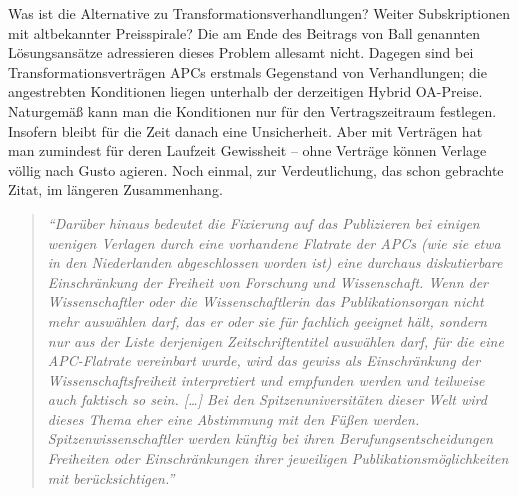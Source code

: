 \documentclass[a4paper,
fontsize=11pt,
oneside,
numbers=noperiodatend,
parskip=half-,
bibliography=totoc,
final
]{scrartcl}
\begin{document}
Was ist die Alternative zu Transformationsverhandlungen? Weiter
Subskriptionen mit altbekannter Preisspirale? Die am Ende des Beitrags
von Ball genannten Lösungsansätze adressieren dieses Problem allesamt
nicht. Dagegen sind bei Transformationsverträgen APCs erstmals
Gegenstand von Verhandlungen; die angestrebten Konditionen liegen
unterhalb der derzeitigen Hybrid OA-Preise. Naturgemäß kann man die
Konditionen nur für den Vertragszeitraum festlegen. Insofern bleibt für
die Zeit danach eine Unsicherheit. Aber mit Verträgen hat man zumindest
für deren Laufzeit Gewissheit -- ohne Verträge können Verlage völlig
nach Gusto agieren. Noch einmal, zur Verdeutlichung, das schon gebrachte
Zitat, im längeren Zusammenhang.

\begin{quote}
\emph{\enquote{Darüber hinaus bedeutet die Fixierung auf das Publizieren
bei einigen wenigen Verlagen durch eine vorhandene Flatrate der APCs
(wie sie etwa in den Niederlanden abgeschlossen worden ist) eine
durchaus diskutierbare Einschränkung der Freiheit von Forschung und
Wissenschaft. Wenn der Wissenschaftler oder die Wissenschaftlerin das
Publikationsorgan nicht mehr auswählen darf, das er oder sie für
fachlich geeignet hält, sondern nur aus der Liste derjenigen
Zeitschriftentitel auswählen darf, für die eine APC-Flatrate vereinbart
wurde, wird das gewiss als Einschränkung der Wissenschaftsfreiheit
interpretiert und empfunden werden und teilweise auch faktisch so sein.
{[}\ldots{}{]} Bei den Spitzenuniversitäten dieser Welt wird dieses
Thema eher eine Abstimmung mit den Füßen werden. Spitzenwissenschaftler
werden künftig bei ihren Berufungsentscheidungen Freiheiten oder
Einschränkungen ihrer jeweiligen Publikationsmöglichkeiten mit
berücksichtigen.}}
\end{quote}
\end{document}
